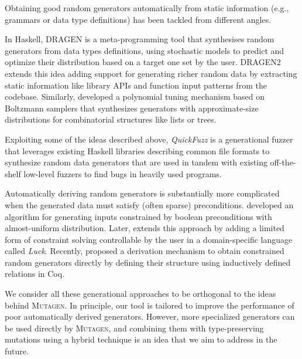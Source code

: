 \documentclass[acmsmall, anonymous]{acmart}
\newcommand{\mutagen}{\textsc{Mutagen}\xspace}
\begin{document}
Obtaining good random generators automatically from static information (e.g.,
grammars or data type definitions) has been tackled from different angles.

In Haskell, DRAGEN \cite{DBLP:conf/haskell/MistaRH18} is a meta-programming tool
that synthesises random generators from data types definitions, using stochastic
models to predict and optimize their distribution based on a target one set by
the user.
%
DRAGEN2 \cite{Mista2019GeneratingRS} extends this idea adding support for
generating richer random data by extracting static information like library APIs
and function input patterns from the codebase.
%
Similarly, \cite{Bendkowski2017} developed a polynomial tuning mechanism based
on Boltzmann samplers \cite{Duchon2004} that synthesizes generators with
approximate-size distributions for combinatorial structures like lists or trees.

%
%
Exploiting some of the ideas described above, \emph{QuickFuzz} \cite{GriecoCB16,
  grieco2017} is a generational fuzzer that leverages existing Haskell libraries
describing common file formats to synthesize random data generators that are
used in tandem with existing off-the-shelf low-level fuzzers to find bugs in
heavily used programs.



Automatically deriving random generators is substantially more complicated when
the generated data must satisfy (often sparse) preconditions.
%
%
\citeauthor{ClaessenDP14} \citeyearpar{ClaessenDP14} developed an algorithm for
generating inputs constrained by boolean preconditions with almost-uniform
distribution.
%
%
Later, \citeauthor{LampropoulosGHH17} \citeyearpar{LampropoulosGHH17} extends
this approach by adding a limited form of constraint solving controllable by the
user in a domain-specific language called \emph{Luck}.
%
%
Recently, \citeauthor{Lampropoulos2017} \citeyearpar{Lampropoulos2017} proposed
a derivation mechanism to obtain constrained random generators directly by
defining their structure using inductively defined relations in Coq.



We consider all these generational approaches to be orthogonal to the ideas
behind \mutagen.
%
In principle, our tool is tailored to improve the performance of poor
automatically derived generators.
%
However, more specialized generators can be used directly by \mutagen, and
combining them with type-preserving mutations using a hybrid technique is an
idea that we aim to address in the future.
\end{document}
